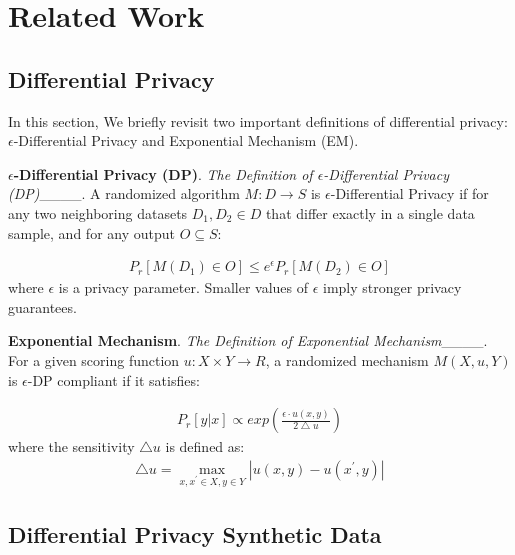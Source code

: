 \section{Related Work}
\subsection{Differential Privacy}
\label{sec:dp}
In this section, We briefly revisit two important definitions of differential privacy: $\epsilon$-Differential Privacy and Exponential Mechanism (EM).

\textbf{$\epsilon$-Differential Privacy (DP)}.
\textit{The Definition of $\epsilon$-Differential Privacy (DP)}____. 
A randomized algorithm $M: D \to S $ is $\epsilon$-Differential Privacy if for any two neighboring datasets $D_1, D_2 \in D$ that differ exactly in a single data sample, and for any output $O \subseteq S$:

\begin{equation}\label{eq:dp-0}
\begin{aligned}
     P_r[M(D_1) \in O] \le e^{\epsilon} P_r[M(D_2) \in O]
\end{aligned}
\end{equation}
where $\epsilon$ is a privacy parameter. Smaller values of $\epsilon$ imply stronger privacy guarantees.


\textbf{Exponential Mechanism}.
\textit{The Definition of Exponential Mechanism}____. For a given scoring function $u: X\times Y \to  R$, a randomized mechanism $M(X, u, Y)$ is $\epsilon$-DP compliant if it satisfies: 

\begin{equation}\label{eq:dp-1}
\begin{aligned}
     P_r[y|x]\propto exp(\frac{\epsilon \cdot u(x,y) }{2\bigtriangleup u }  )
\end{aligned}
\end{equation}
where the sensitivity $\bigtriangleup u$ is defined as:
\begin{equation}\label{eq:dp-2}
\begin{aligned}
    \bigtriangleup u = \max_{x,x^{'} \in X, y\in Y} |u(x,y) - u(x^{'},y)| 
\end{aligned}
\end{equation}


\subsection{Differential Privacy Synthetic Data}

